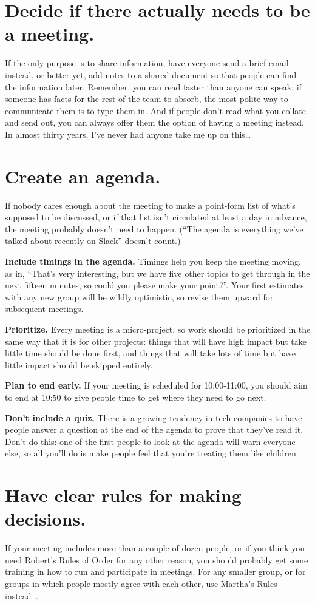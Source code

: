 \documentclass[10pt,letterpaper]{article}
\newcommand{\rulemajor}[1]{\section{#1}}
\begin{document}
\rulemajor{Decide if there actually needs to be a meeting.}

If the only purpose is to share information, have everyone send a brief email
instead, or better yet, add notes to a shared document so that people can find
the information later. Remember, you can read faster than anyone can speak: if
someone has facts for the rest of the team to absorb, the most polite way to
communicate them is to type them in.  And if people don't read what you collate
and send out, you can always offer them the option of having a meeting instead.
In almost thirty years, I've never had anyone take me up on this{\ldots}

\rulemajor{Create an agenda.}

If nobody cares enough about the meeting to make a point-form list of what's
supposed to be discussed, or if that list isn't circulated at least a day in
advance, the meeting probably doesn't need to happen.  (``The agenda is
everything we've talked about recently on Slack'' doesn't count.)

\textbf{Include timings in the agenda.}  Timings help you keep the meeting
moving, as in, ``That's very interesting, but we have five other topics to get
through in the next fifteen minutes, so could you please make your point?''.
Your first estimates with any new group will be wildly optimistic, so revise
them upward for subsequent meetings.

\textbf{Prioritize.}  Every meeting is a micro-project, so work should be
prioritized in the same way that it is for other projects: things that will have
high impact but take little time should be done first, and things that will take
lots of time but have little impact should be skipped entirely.

\textbf{Plan to end early.}  If your meeting is scheduled for 10:00-11:00, you
should aim to end at 10:50 to give people time to get where they need to go
next.

\textbf{Don't include a quiz.}  There is a growing tendency in tech companies to
have people answer a question at the end of the agenda to prove that they've
read it.  Don't do this: one of the first people to look at the agenda will warn
everyone else, so all you'll do is make people feel that you're treating them
like children.

\rulemajor{Have clear rules for making decisions.}

If your meeting includes more than a couple of dozen people, or if you think you
need Robert's Rules of Order for any other reason, you should probably get some
training in how to run and participate in meetings.  For any smaller group, or
for groups in which people mostly agree with each other, use Martha's Rules
instead~\cite{Minahan1986}.
\end{document}
